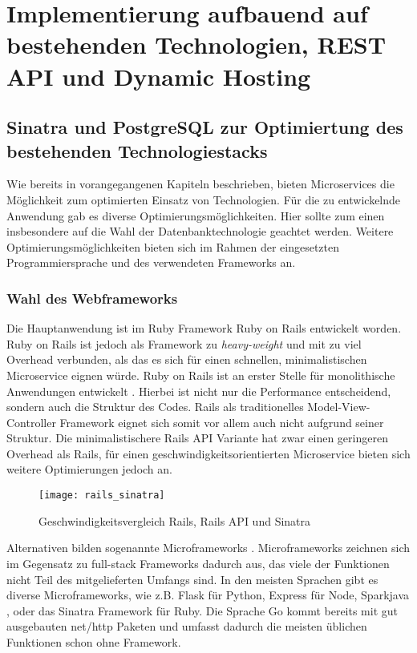 \chapter{Implementierung aufbauend auf bestehenden Technologien, REST API und Dynamic Hosting}

\section{Sinatra und PostgreSQL zur Optimiertung des bestehenden Technologiestacks}
Wie bereits in vorangegangenen Kapiteln beschrieben, bieten Microservices die Möglichkeit zum optimierten Einsatz von Technologien. Für die zu entwickelnde Anwendung gab es diverse Optimierungsmöglichkeiten. Hier sollte zum einen insbesondere auf die Wahl der Datenbanktechnologie geachtet werden. Weitere Optimierungsmöglichkeiten bieten sich im Rahmen der eingesetzten Programmiersprache und des verwendeten Frameworks an.

\subsection{Wahl des Webframeworks}
Die Hauptanwendung ist im Ruby Framework Ruby on Rails \cite{rails} entwickelt worden. Ruby on Rails ist jedoch als Framework zu \textit{heavy-weight} und mit zu viel Overhead verbunden, als das es sich für einen schnellen, minimalistischen Microservice eignen würde. Ruby on Rails ist an erster Stelle für monolithische Anwendungen entwickelt \cite[][]{rails:doctrine}.
Hierbei ist nicht nur die Performance entscheidend, sondern auch die Struktur des Codes. Rails als traditionelles Model-View-Controller Framework \cite[][]{wiki:mvc} eignet sich somit vor allem auch nicht aufgrund seiner Struktur. Die minimalistischere Rails API Variante\cite{rails:api} hat zwar einen geringeren Overhead als Rails, für einen geschwindigkeitsorientierten Microservice bieten sich weitere Optimierungen jedoch an.

\begin{figure}[!ht]
    \centering
    \caption{Geschwindigkeitsvergleich Rails, Rails API und Sinatra \cite{newrelic:soa}}
    \label{fig:speed}
    \texttt{[image: rails\_sinatra]}
\end{figure}

Alternativen bilden sogenannte Microframeworks \cite{wiki:micro}. Microframeworks zeichnen sich im Gegensatz zu full-stack Frameworks dadurch aus, das viele der Funktionen nicht Teil des mitgelieferten Umfangs sind. In den meisten Sprachen gibt es diverse Microframeworks, wie z.B. Flask \cite{flask} für Python, Express \cite{expressjs} für Node, Sparkjava \cite{sparkjava}, oder das Sinatra Framework \cite{sinatra} für Ruby. Die Sprache Go \cite{golang} kommt bereits mit gut ausgebauten net/http Paketen und umfasst dadurch die meisten üblichen Funktionen schon ohne Framework.

